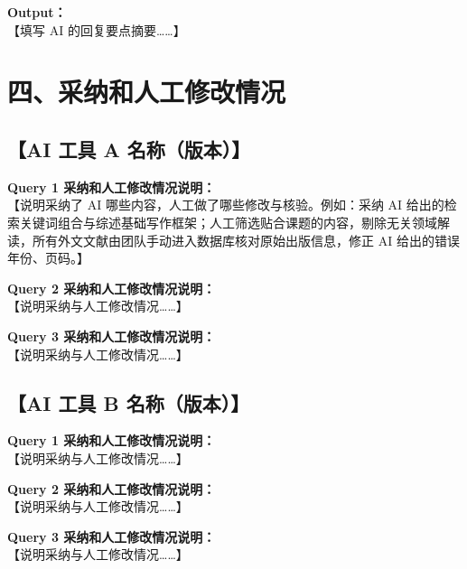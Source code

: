 \documentclass[a4paper,12pt]{article}
\begin{document}
\noindent\textbf{Output：}\\
【填写 AI 的回复要点摘要……】

\section*{四、采纳和人工修改情况}

\subsection*{\textbf{【AI 工具 A 名称（版本）】}}

\noindent\textbf{Query 1 采纳和人工修改情况说明：}\\
【说明采纳了 AI 哪些内容，人工做了哪些修改与核验。例如：采纳 AI 给出的检索关键词组合与综述基础写作框架；人工筛选贴合课题的内容，剔除无关领域解读，所有外文文献由团队手动进入数据库核对原始出版信息，修正 AI 给出的错误年份、页码。】

\vspace{0.6em}
\noindent\textbf{Query 2 采纳和人工修改情况说明：}\\
【说明采纳与人工修改情况……】

\vspace{0.6em}
\noindent\textbf{Query 3 采纳和人工修改情况说明：}\\
【说明采纳与人工修改情况……】

\subsection*{\textbf{【AI 工具 B 名称（版本）】}}

\noindent\textbf{Query 1 采纳和人工修改情况说明：}\\
【说明采纳与人工修改情况……】

\vspace{0.6em}
\noindent\textbf{Query 2 采纳和人工修改情况说明：}\\
【说明采纳与人工修改情况……】

\vspace{0.6em}
\noindent\textbf{Query 3 采纳和人工修改情况说明：}\\
【说明采纳与人工修改情况……】
\end{document}
